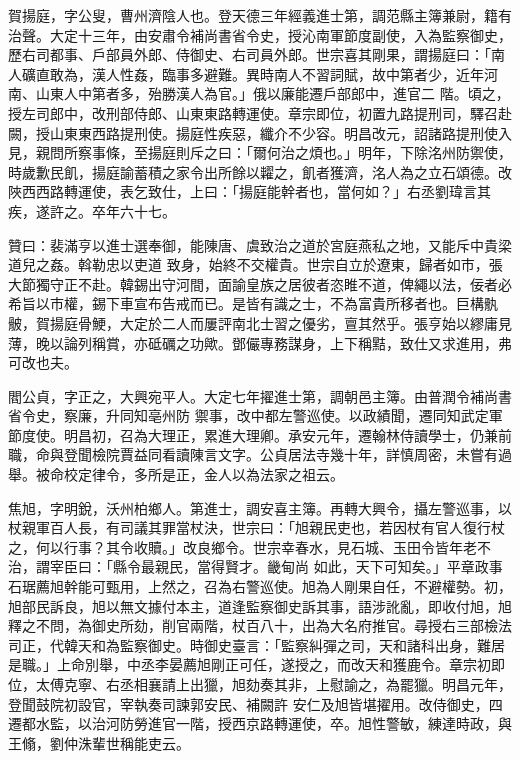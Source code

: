 \begin{pinyinscope}
 賀揚庭，字公叟，曹州濟陰人也。登天德三年經義進士第，調范縣主簿兼尉，籍有治聲。大定十三年，由安肅令補尚書省令史，授沁南軍節度副使，入為監察御史，歷右司都事、戶部員外郎、侍御史、右司員外郎。世宗喜其剛果，謂揚庭曰：「南人礦直敢為，漢人性姦，臨事多避難。異時南人不習詞賦，故中第者少，近年河南、山東人中第者多，殆勝漢人為官。」俄以廉能遷戶部郎中，進官二
 階。頃之，授左司郎中，改刑部侍郎、山東東路轉運使。章宗即位，初置九路提刑司，驛召赴闕，授山東東西路提刑使。揚庭性疾惡，纖介不少容。明昌改元，詔諸路提刑使入見，親問所察事條，至揚庭則斥之曰：「爾何治之煩也。」明年，下除洺州防禦使，時歲歉民飢，揚庭諭蓄積之家令出所餘以糶之，飢者獲濟，洺人為之立石頌德。改陜西西路轉運使，表乞致仕，上曰：「揚庭能幹者也，當何如？」右丞劉瑋言其疾，遂許之。卒年六十七。



 贊曰：裴滿亨以進士選奉御，能陳唐、虞致治之道於宮庭燕私之地，又能斥中貴梁道兒之姦。斡勒忠以吏道
 致身，始終不交權貴。世宗自立於遼東，歸者如市，張大節獨守正不赴。韓錫出守河間，面諭皇族之居彼者恣睢不道，俾繩以法，佞者必希旨以市權，錫下車宣布告戒而已。是皆有識之士，不為富貴所移者也。巨構骫骳，賀揚庭骨鯁，大定於二人而屢評南北士習之優劣，亶其然乎。張亨始以繆庸見薄，晚以論列稱賞，亦砥礪之功歟。鄧儼專務謀身，上下稱黠，致仕又求進用，弗可改也夫。



 閻公貞，字正之，大興宛平人。大定七年擢進士第，調朝邑主簿。由普潤令補尚書省令史，察廉，升同知亳州防
 禦事，改中都左警巡使。以政績聞，遷同知武定軍節度使。明昌初，召為大理正，累進大理卿。承安元年，遷翰林侍讀學士，仍兼前職，命與登聞檢院賈益同看讀陳言文字。公貞居法寺幾十年，詳慎周密，未嘗有過舉。被命校定律令，多所是正，金人以為法家之祖云。



 焦旭，字明銳，沃州柏鄉人。第進士，調安喜主簿。再轉大興令，攝左警巡事，以杖親軍百人長，有司議其罪當杖決，世宗曰：「旭親民吏也，若因杖有官人復行杖之，何以行事？其令收贖。」改良鄉令。世宗幸春水，見石城、玉田令皆年老不治，謂宰臣曰：「縣令最親民，當得賢才。畿甸尚
 如此，天下可知矣。」平章政事石琚薦旭幹能可甄用，上然之，召為右警巡使。旭為人剛果自任，不避權勢。初，旭部民訴良，旭以無文據付本主，道逢監察御史訴其事，語涉訛亂，即收付旭，旭釋之不問，為御史所劾，削官兩階，杖百八十，出為大名府推官。尋授右三部檢法司正，代韓天和為監察御史。時御史臺言：「監察糾彈之司，天和諸科出身，難居是職。」上命別舉，中丞李晏薦旭剛正可任，遂授之，而改天和獲鹿令。章宗初即位，太傅克寧、右丞相襄請上出獵，旭劾奏其非，上慰諭之，為罷獵。明昌元年，登聞鼓院初設官，宰執奏司諫郭安民、補闕許
 安仁及旭皆堪擢用。改侍御史，四遷都水監，以治河防勞進官一階，授西京路轉運使，卒。旭性警敏，練達時政，與王翛，劉仲洙輩世稱能吏云。




\end{pinyinscope}
